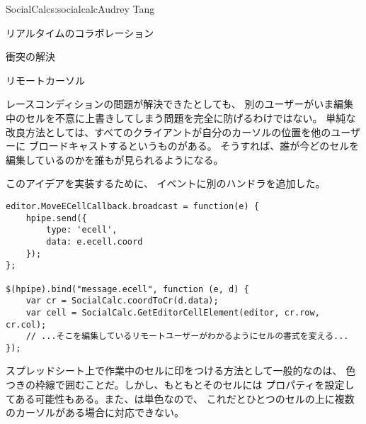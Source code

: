 \begin{aosachapter}{SocialCalc}{s:socialcalc}{Audrey Tang}
\begin{aosasect1}{リアルタイムのコラボレーション}
\begin{aosasect2}{衝突の解決}
\end{aosasect2}

\begin{aosasect2}{リモートカーソル}

レースコンディションの問題が解決できたとしても、
別のユーザーがいま編集中のセルを不意に上書きしてしまう問題を完全に防げるわけではない。
単純な改良方法としては、すべてのクライアントが自分のカーソルの位置を他のユーザーに
ブロードキャストするというものがある。
そうすれば、誰が今どのセルを編集しているのかを誰もが見られるようになる。

このアイデアを実装するために、
イベントに別のハンドラを追加した。


\begin{verbatim}
editor.MoveECellCallback.broadcast = function(e) {
    hpipe.send({
        type: 'ecell',
        data: e.ecell.coord
    });
};

$(hpipe).bind("message.ecell", function (e, d) {
    var cr = SocialCalc.coordToCr(d.data);
    var cell = SocialCalc.GetEditorCellElement(editor, cr.row, cr.col);
    // ...そこを編集しているリモートユーザーがわかるようにセルの書式を変える...
});
\end{verbatim}

スプレッドシート上で作業中のセルに印をつける方法として一般的なのは、
色つきの枠線で囲むことだ。しかし、もともとそのセルには
プロパティを設定してある可能性もある。また、は単色なので、
これだとひとつのセルの上に複数のカーソルがある場合に対応できない。


\end{aosasect2}
\end{aosasect1}
\end{aosachapter}
